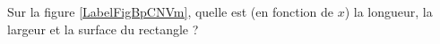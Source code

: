 
\begin{exercice}\label{exoSeconde-0018}

Sur la figure \ref{LabelFigBpCNVm}, quelle est (en fonction de \( x\)) la longueur, la largeur et la surface du rectangle ?
\newcommand{\CaptionFigBpCNVm}{figure de l'exercice \ref{exoSeconde-0018}}


\end{exercice}
